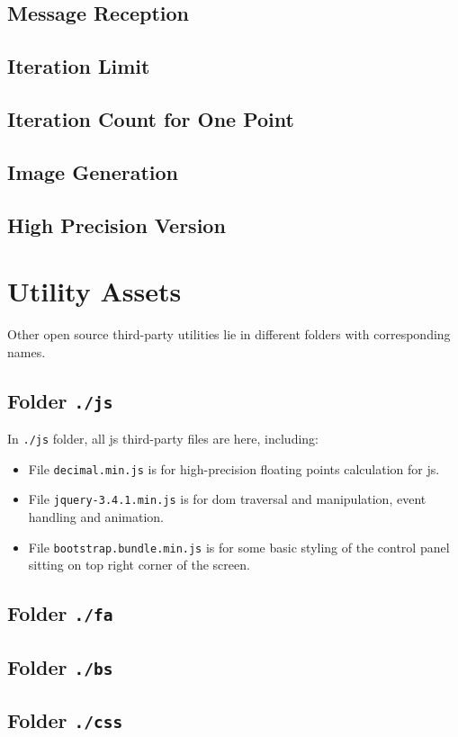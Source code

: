 \subsection{Message Reception}

\subsection{Iteration Limit}

\subsection{Iteration Count for One Point}

\subsection{Image Generation}

\subsection{High Precision Version}

\section{Utility Assets}

Other open source third-party utilities lie in different folders with corresponding names.

\subsection{Folder \texttt{./js}}

In \texttt{./js} folder, all \gls{js} third-party files are here, including:

\begin{itemize}
    \item File \texttt{decimal.min.js} is for high-precision floating points calculation for \glsdesc{js}.
    \item File \texttt{jquery-3.4.1.min.js} is for \gls{dom} traversal and manipulation, event handling and animation.
    \item File \texttt{bootstrap.bundle.min.js} is for some basic styling of the control panel sitting on top right corner of the screen.
\end{itemize}

\subsection{Folder \texttt{./fa}}

\subsection{Folder \texttt{./bs}}

\subsection{Folder \texttt{./css}}